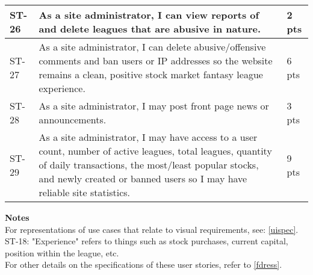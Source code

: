 \begin{longtable}{|p{0.6in}|p{4.6in}|p{0.5in}|}
ST-26&As a site administrator, I can view reports of and delete leagues that are abusive in nature.&2 pts  \\ \hline 
ST-27&As a site administrator, I can delete abusive/offensive comments and ban users or IP addresses so the website remains a clean, positive stock market fantasy league experience.&6 pts  \\ \hline 
ST-28&As a site administrator, I may post front page news or announcements.&3 pts  \\ \hline 
ST-29&As a site administrator, I may have access to a user count, number of active leagues, total leagues, quantity of daily transactions, the most/least popular stocks, and newly created or banned users so I may have reliable site statistics. &9 pts \\ \hline 
\end{longtable}

\textbf{Notes}\\
For representations of use cases that relate to visual requirements, see: \ref{uispec}.\\
ST-18: "Experience" refers to things such as stock purchases, current capital, position within the league, etc.\\
For other details on the specifications of these user stories, refer to \ref{fdress}.\\
